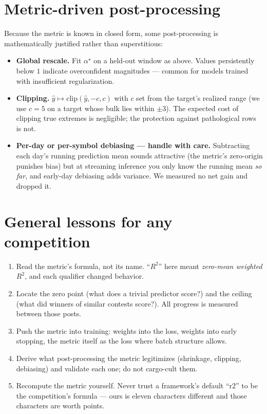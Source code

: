 \section{Metric-driven post-processing}

Because the metric is known in closed form, some post-processing is
mathematically justified rather than superstitious:

\begin{itemize}
\item \textbf{Global rescale.} Fit $\alpha^\star$ on a held-out window
  as above. Values persistently below $1$ indicate overconfident
  magnitudes --- common for models trained with insufficient
  regularization.
\item \textbf{Clipping.} $\hat y \mapsto \mathrm{clip}(\hat y, -c, c)$ with
  $c$ set from the target's realized range (we use $c=5$ on a target whose
  bulk lies within $\pm 3$). The expected cost of clipping true extremes is
  negligible; the protection against pathological rows is not.
\item \textbf{Per-day or per-symbol debiasing --- handle with care.}
  Subtracting each day's running prediction mean sounds attractive
  (the metric's zero-origin punishes bias) but at streaming inference you
  only know the running mean \emph{so far}, and early-day debiasing adds
  variance. We measured no net gain and dropped it.
\end{itemize}

\section{General lessons for any competition}

\begin{enumerate}
\item Read the metric's formula, not its name. ``$R^2$'' here meant
  \emph{zero-mean weighted} $R^2$, and each qualifier changed behavior.
\item Locate the zero point (what does a trivial predictor score?) and the
  ceiling (what did winners of similar contests score?). All progress is
  measured between those posts.
\item Push the metric into training: weights into the loss, weights into
  early stopping, the metric itself as the loss where batch structure
  allows.
\item Derive what post-processing the metric legitimizes (shrinkage,
  clipping, debiasing) and validate each one; do not cargo-cult them.
\item Recompute the metric yourself. Never trust a framework's default
  ``r2'' to be the competition's formula --- ours is eleven characters
  different and those characters are worth points.
\end{enumerate}

